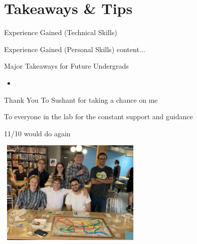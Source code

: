 \documentclass{beamer}
\begin{document}
	\section{Takeaways \& Tips}
	\begin{frame}{Experience Gained (Technical Skills)}
		
	\end{frame}

	\begin{frame}{Experience Gained (Personal Skills)}
		content...
	\end{frame}

	\begin{frame}{Major Takeaways for Future Undergrads}
		\begin{itemize}
			\item 
		\end{itemize}
	\end{frame}

	\begin{frame}{Thank You}
		To Sushant for taking a chance on me
		
		To everyone in the lab for the constant support and guidance
		
		11/10 would do again
		
		\begin{center}
			\includegraphics[width=7cm, height=5cm]{lab.jpg}
		\end{center}
	\end{frame}	
\end{document}
